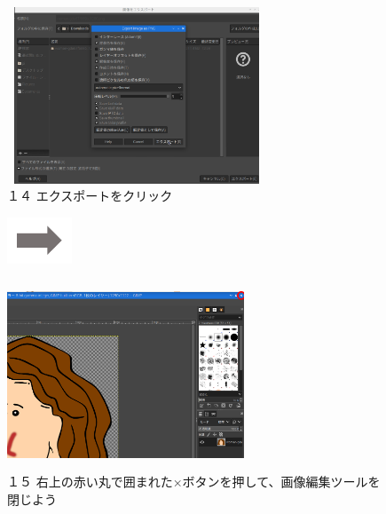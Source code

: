 \documentclass[a4paper,12pt]{jarticle}
\begin{document}
\begin{figure}
  \begin{minipage}{\textwidth}
    \begin{minipage}{8.074cm}
      \includegraphics[width=7.721cm,height=5.26cm]{textbook-img134.png}\\
      １４ エクスポートをクリック
    \end{minipage}
    \includegraphics[width=1.919cm,height=1.365cm]{textbook-img135.png}
    \begin{minipage}{7.328cm}
      \includegraphics[width=7.061cm,height=5.653cm]{textbook-img1030.png}\\
      １５
      右上の赤い丸で囲まれた×ボタンを押して、画像編集ツールを閉じよう
    \end{minipage}
  \end{minipage}



\end{figure}
\clearpage
\end{document}
